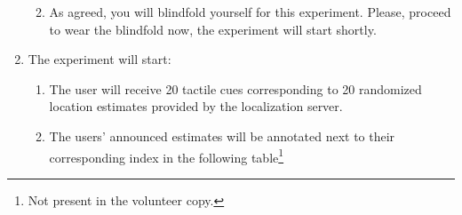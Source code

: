 \begin{enumerate}
\begin{framed}
\begin{enumerate}
\begin{itemize}
\end{itemize}

\item As agreed, you will blindfold yourself for this experiment. Please, proceed to wear the blindfold now, the experiment will start shortly.
\end{enumerate}
\end{framed}

\item The experiment will start:
\begin{enumerate}
\item The user will receive 20 tactile cues corresponding to 20 randomized location estimates provided by the localization server.
\item The users' announced estimates will be annotated next to their corresponding index in the following table\footnote{Not present in the volunteer copy.}



\end{enumerate}
\end{enumerate}
